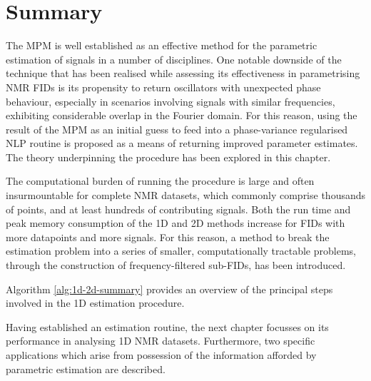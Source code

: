 \section{Summary}
The \ac{MPM} is well established as an effective method for the parametric
estimation of signals in a number of disciplines.
One notable downside of the technique that has been realised while assessing
its effectiveness in parametrising \ac{NMR} \acp{FID} is its propensity to
return oscillators with unexpected phase behaviour, especially in scenarios
involving signals with similar frequencies, exhibiting considerable overlap in
the Fourier domain.
For this reason, using the result of the \ac{MPM} as an initial guess to feed
into a phase-variance regularised \ac{NLP} routine is proposed as a means of
returning improved parameter estimates. The theory underpinning the procedure
has been explored in this chapter.

The computational burden of running the procedure is large and often
insurmountable for complete \ac{NMR} datasets, which commonly comprise thousands of
points, and at least hundreds of contributing signals. Both the run time
and peak memory consumption of the \ac{1D} and \ac{2D} methods increase for \acp{FID} with more datapoints and more signals.
For this reason, a method to break the estimation problem into a
series of smaller, computationally tractable problems, through the construction
of frequency-filtered sub-\acp{FID}, has been introduced.

Algorithm \ref{alg:1d-2d-summary} provides an overview of the principal steps
involved in the \ac{1D} estimation procedure.

Having established an estimation routine, the next chapter focusses on its
performance in analysing \ac{1D} \ac{NMR} datasets. Furthermore, two specific
applications which arise from possession of the information afforded by
parametric estimation are described.


